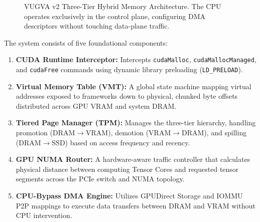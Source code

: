 \documentclass[11pt,twocolumn]{article}
\begin{document}
\begin{figure}[t]
\caption{VUGVA v2 Three-Tier Hybrid Memory Architecture. The CPU operates exclusively in the control plane, configuring DMA descriptors without touching data-plane traffic.}
\label{fig:arch_overview}
\end{figure}

The system consists of five foundational components:

\begin{enumerate}[nosep]
    \item \textbf{CUDA Runtime Interceptor:} Intercepts \texttt{cudaMalloc}, \texttt{cudaMallocManaged}, and \texttt{cudaFree} commands using dynamic library preloading (\texttt{LD\_PRELOAD}).
    \item \textbf{Virtual Memory Table (VMT):} A global state machine mapping virtual addresses exposed to frameworks down to physical, chunked byte offsets distributed across GPU VRAM and system DRAM.
    \item \textbf{Tiered Page Manager (TPM):} Manages the three-tier hierarchy, handling promotion (DRAM$\rightarrow$VRAM), demotion (VRAM$\rightarrow$DRAM), and spilling (DRAM$\rightarrow$SSD) based on access frequency and recency.
    \item \textbf{GPU NUMA Router:} A hardware-aware traffic controller that calculates physical distance between computing Tensor Cores and requested tensor segments across the PCIe switch and NUMA topology.
    \item \textbf{CPU-Bypass DMA Engine:} Utilizes GPUDirect Storage and IOMMU P2P mappings to execute data transfers between DRAM and VRAM without CPU intervention.
\end{enumerate}
\end{document}
